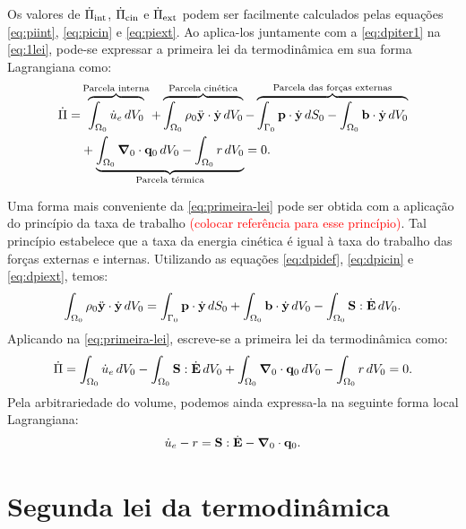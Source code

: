 \documentclass[Tese.tex]{subfiles}
\begin{document}
Os valores de $\dot{\Pi}_\text{int}$, $\dot{\Pi}_\text{cin}$ e $\dot{\Pi}_\text{ext}$ podem ser facilmente calculados pelas equações \eqref{eq:piint}, \eqref{eq:picin} e \eqref{eq:piext}. Ao aplica-los juntamente com a \cref{eq:dpiter1} na \cref{eq:1lei}, pode-se expressar a primeira lei da termodinâmica em sua forma Lagrangiana como:
\begin{equation}
\begin{aligned}\label{eq:primeira-lei}
\dot{\Pi} = & \overbrace{\int_{\Omega_0}\dot{u}_e\,dV_0}^\text{Parcela interna} + \overbrace{\int_{\Omega_0}\rho_0 \ddot{\mathbf{y}}\cdot\dot{\mathbf{y}}\,dV_0}^\text{Parcela cinética} - \overbrace{\int_{\Gamma_0}\mathbf{p}\cdot\dot{\mathbf{y}}\,dS_0 - \int_{\Omega_0}\mathbf{b}\cdot\dot{\mathbf{y}}\,dV_0}^\text{Parcela das forças externas}  \\
& + \underbrace{\int_{\Omega_0} \boldsymbol{\nabla}_0\cdot\mathbf{q}_0\,dV_0 - \int_{\Omega_0}r\,dV_0}_\text{Parcela térmica} = 0.
\end{aligned}
\end{equation}

Uma forma mais conveniente da \cref{eq:primeira-lei} pode ser obtida com a aplicação do princípio da taxa de trabalho \textcolor{red}{(colocar referência para esse princípio)}. Tal princípio estabelece que a taxa da energia cinética é igual à taxa do trabalho das forças externas e internas. Utilizando as equações \eqref{eq:dpidef}, \eqref{eq:dpicin} e \eqref{eq:dpiext}, temos:
\begin{equation}
\int_{\Omega_0}\rho_0 \ddot{\mathbf{y}}\cdot\dot{\mathbf{y}}\,dV_0 = \int_{\Gamma_0}\mathbf{p}\cdot\dot{\mathbf{y}}\,dS_0 + \int_{\Omega_0}\mathbf{b}\cdot\dot{\mathbf{y}}\,dV_0 - \int_{\Omega_0}\mathbf{S}:\dot{\mathbf{E}}\,dV_0.
\end{equation}
Aplicando na \cref{eq:primeira-lei}, escreve-se a primeira lei da termodinâmica como:
\begin{equation}%
\dotEnergia = \int_{\domVoli}\dotenergiaint\,d\voli - \int_{\domVoli}\S:\dotE\,d\voli + \int_{\domVoli} \gradientei\cdot\qi\,d\voli - \int_{\domVoli} \calorInt\,d\voli = 0.
\end{equation}
Pela arbitrariedade do volume, podemos ainda expressa-la na seguinte forma local Lagrangiana:
\begin{equation}\label{eq:primeira-lei-local}
\dot{u}_e - r = \mathbf{S}:\dot{\mathbf{E}} - \boldsymbol{\nabla}_0\cdot\mathbf{q}_0.
\end{equation}

\section{Segunda lei da termodinâmica}
\end{document}
